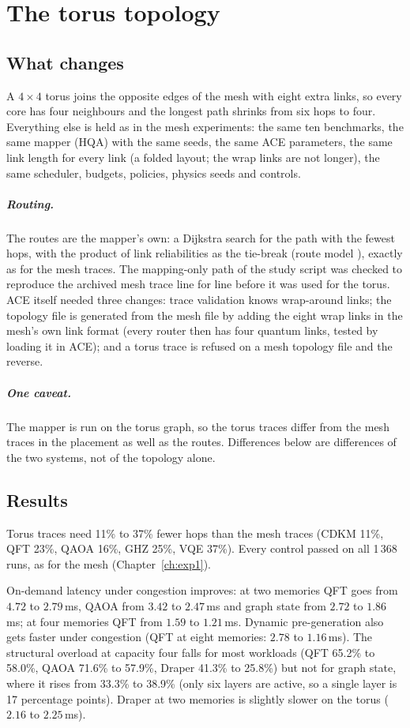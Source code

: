 \chapter{The torus topology}
\label{ch:torus}

\section{What changes}
A $4\times4$ torus joins the opposite edges of the mesh with eight extra links, so every core has four neighbours and the longest path shrinks from six hops to four. Everything else is held as in the
mesh experiments: the same ten benchmarks, the same mapper (HQA) with the same seeds, the same ACE parameters, the same link length for every link (a folded layout; the wrap links are not longer),
the same scheduler, budgets, policies, physics seeds and controls.

\paragraph{Routing.} The routes are the mapper's own: a Dijkstra search for the path with the fewest hops, with the product of link reliabilities as the tie-break (route model ), exactly as for the mesh
traces. The mapping-only path of the study script was checked to reproduce the archived mesh trace line for line before it was used for the torus. ACE itself needed three changes: trace validation
knows wrap-around links; the topology file is generated from the mesh file by adding the eight wrap links in the mesh's own link format (every router then has four quantum links, tested by loading it in ACE);
and a torus trace is refused on a mesh topology file and the reverse.

\paragraph{One caveat.} The mapper is run on the torus graph, so the torus traces differ from the mesh traces in the placement as well as the routes. Differences below are differences of the two systems, not of the topology alone.

\section{Results}
Torus traces need 11\% to 37\% fewer hops than the mesh traces (CDKM 11\%, QFT 23\%, QAOA 16\%, GHZ 25\%, VQE 37\%). Every control passed on all 1\,368 runs, as for the mesh (Chapter~\ref{ch:exp1}).

On-demand latency under congestion improves: at two memories QFT goes from $4.72$ to $2.79$\,ms, QAOA from $3.42$ to $2.47$\,ms and graph state from $2.72$ to $1.86$\,ms; at four memories QFT from $1.59$ to $1.21$\,ms. Dynamic pre-generation also gets faster under congestion (QFT at eight memories: $2.78$ to $1.16$\,ms). The structural overload at capacity four falls for most workloads (QFT 65.2\% to 58.0\%, QAOA 71.6\% to 57.9\%, Draper 41.3\% to 25.8\%) but not for graph state, where
it rises from 33.3\% to 38.9\% (only six layers are active, so a single layer is 17 percentage points). Draper at two memories is slightly slower on the torus ($2.16$ to $2.25$\,ms).


